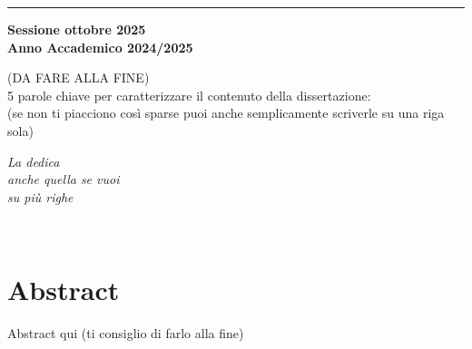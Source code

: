 \documentclass[12pt,a4paper,twoside]{book}
\begin{document}
\begin{titlepage}
\vspace{30mm}

\rule[0.5cm]{15.8cm}{0.6mm}

\begin{center}
{\large{\bf Sessione ottobre 2025 \\}}
{\large{\bf Anno Accademico 2024/2025\\}}
\end{center}

\end{titlepage}

\restoregeometry
\newpage
\begin{center}
    (DA FARE ALLA FINE)\\
    5 parole chiave per caratterizzare il contenuto della dissertazione:\\ (se non ti piacciono così sparse puoi anche semplicamente scriverle su una riga sola)
\end{center}

\newpage

\topmargin=6.5cm
\begin{flushright}
\emph{
\LARGE{La dedica}\\\vspace{2mm}
\LARGE{anche quella se vuoi}\\\vspace{3mm} 
\LARGE{su più righe} 
}
\end{flushright}
\newpage~\newpage
{}
\chapter*{Abstract}
Abstract qui (ti consiglio di farlo alla fine)

\topmargin=-1cm
\tableofcontents
\thispagestyle{empty}
\listoftables
\thispagestyle{empty}
\listoffigures
\thispagestyle{empty}
\newpage~\newpage


\setcounter{chapter}{-1}
\raggedbottom
\end{document}
